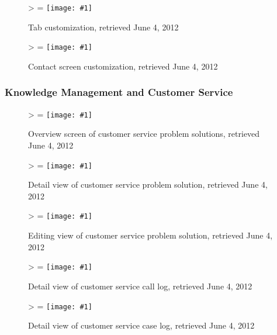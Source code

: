 \documentclass[12pt,letterpaper]{article}
\newlength{\imgwidth}
\newlength{\imgheight}
\newlength{\finalwidth}
\newlength{\finalheight}
\newlength{\imgtextheight}
\newcommand\scalegraphics[1]{%
	\settowidth{\imgwidth}{\texttt{[image: \#1]}}%
	\settoheight{\imgheight}{\texttt{[image: \#1]}}%
	\ifnum\imgwidth>\imgheight \def\imgangle{90} \else \def\imgangle{0} \fi%
	\setlength{\imgtextheight}{0.74\textheight}%
	\setlength{\finalwidth}{\minof{\imgwidth}{\textwidth}}%
	\setlength{\finalheight}{\minof{\imgheight}{\imgtextheight}}%
	\ifnum\finalwidth=\imgwidth \def\imgangle{0} \fi%
	\texttt{[image: \#1]}%
}
\begin{document}
\begin{figure}[htbp]
	\centering
	\scalegraphics{./img/force/frce_customize_tabs}
	\caption[salesforce.com: Tab customization]{Tab customization, retrieved June 4, 2012}
\end{figure}

\begin{figure}[htbp]
	\centering
	\scalegraphics{./img/force/frce_customize_contact}
	\caption[salesforce.com: Contact screen customization]{Contact screen customization, retrieved June 4, 2012}
\end{figure}

\newpage
\FloatBarrier
\subsubsection{Knowledge Management and Customer Service}
\begin{figure}[htbp]
	\centering
	\scalegraphics{./img/force/frce_solution_list}
	\caption[salesforce.com: Overview screen of customer service problem solutions]{Overview screen of customer service problem solutions, retrieved June 4, 2012}
\end{figure}

\begin{figure}[htbp]
	\centering
	\scalegraphics{./img/force/frce_solution_detail}
	\caption[salesforce.com: Detail view of customer service problem solution]{Detail view of customer service problem solution, retrieved June 4, 2012}
\end{figure}

\begin{figure}[htbp]
	\centering
	\scalegraphics{./img/force/frce_solution_edit}
	\caption[salesforce.com: Editing view of customer service problem solution]{Editing view of customer service problem solution, retrieved June 4, 2012}
\end{figure}

\begin{figure}[htbp]
	\centering
	\scalegraphics{./img/force/frce_call_log}
	\caption[salesforce.com: Detail view of customer service call log]{Detail view of customer service call log, retrieved June 4, 2012}
\end{figure}

\begin{figure}[htbp]
	\centering
	\scalegraphics{./img/force/frce_case_log}
	\caption[salesforce.com: Detail view of customer service case log]{Detail view of customer service case log, retrieved June 4, 2012}
\end{figure}
\end{document}
